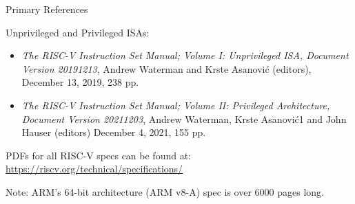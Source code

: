 \documentclass{article}
\newcommand{\hmmmm}{\hspace*{4em}}
\begin{document}
\begin{center}\LARGE
  {\Huge Primary References}

  \vspace{0.5in}

  \begin{minipage}{9in}
    Unprivileged and Privileged ISAs:

    \begin{itemize}
    \item \emph{The RISC-V Instruction Set Manual; Volume I:
    Unprivileged ISA, Document Version 20191213}, Andrew Waterman and
      Krste Asanović (editors), December 13, 2019, 238 pp.

    \item \emph{The RISC-V Instruction Set Manual; Volume II: Privileged Architecture,
    Document Version 20211203}, Andrew Waterman, Krste Asanović1 and John Hauser (editors)
      December 4, 2021, 155 pp.
    \end{itemize}

    \vspace{1in}

    PDFs for all RISC-V specs can be found at: \\
    \hmmmm \url{https://riscv.org/technical/specifications/}
  \end{minipage}

  \vfill

  Note: ARM’s 64-bit architecture (ARM v8-A) spec is over 6000 pages long.

\end{center}

\clearpage

\end{document}
